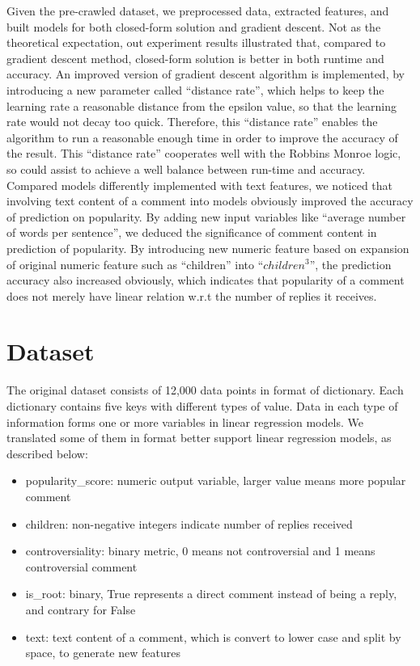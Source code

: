 \documentclass[letterpaper, 11pt]{article}
\begin{document}
Given the pre-crawled dataset, we preprocessed data, extracted features, and built models for both closed-form solution and gradient descent. Not as the theoretical expectation, out experiment results illustrated that, compared to gradient descent method, closed-form solution is better in both runtime and accuracy. An improved version of gradient descent algorithm is implemented, by introducing a new parameter called ``distance rate'', which helps to keep the learning rate a reasonable distance from the epsilon value, so that the learning rate would not decay too quick. Therefore, this ``distance rate'' enables the algorithm to run a reasonable enough time in order to improve the accuracy of the result. This ``distance rate'' cooperates well with the Robbins Monroe logic, so could assist to achieve a well balance between run-time and accuracy. Compared models differently implemented with text features, we noticed that involving text content of a comment into models obviously improved the accuracy of prediction on popularity. By adding new input variables like ``average number of words per sentence'', we deduced the significance of comment content in prediction of popularity. By introducing new numeric feature based on expansion of original numeric feature such as ``children'' into ``$children^{3}$'', the prediction accuracy also increased obviously, which indicates that popularity of a comment does not merely have linear relation w.r.t the number of replies it receives.

\section*{Dataset}

The original dataset consists of 12,000 data points in format of dictionary. Each dictionary contains five keys with different types of value. Data in each type of information forms one or more variables in linear regression models. We translated some of them in format better support linear regression models, as described below:

\begin{itemize}
    \item popularity\_score: numeric output variable, larger value means more popular comment
    \item children: non-negative integers indicate number of replies received
    \item controversiality: binary metric, 0 means not controversial and 1 means controversial comment
    \item is\_root: binary, True represents a direct comment instead of being a reply, and contrary for False
    \item text: text content of a comment, which is convert to lower case and split by space, to generate new features
\end{itemize}
\end{document}
